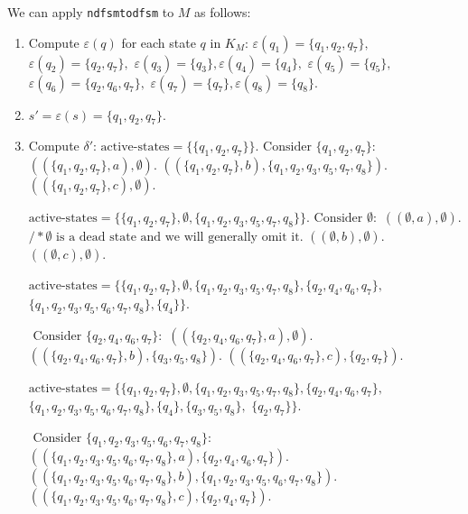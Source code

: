 \documentclass[hidelinks,12pt]{article}
\begin{document}
We can apply \texttt{ndfsmtodfsm} to \( M \) as follows:
\begin{enumerate}
    \item Compute \( \varepsilon(q) \) for each state $ q$ in $ K_M $:
        $ \varepsilon(q_1) = \{q_1, q_2, q_7\}, $
        $ \varepsilon(q_2) = \{q_2, q_7\}, $
        $ \varepsilon(q_3) = \{q_3\}, \varepsilon(q_4) = \{q_4\}, $
        $ \varepsilon(q_5) = \{q_5\}, $
        $ \varepsilon(q_6) = \{q_2, q_6, q_7\}, $
        $ \varepsilon(q_7) = \{q_7\}, \varepsilon(q_8) = \{q_8\}. $

    \item \( s' = \varepsilon(s) = \{q_1, q_2, q_7\} \).

    \item Compute \( \delta' \):
        $ \text{active-states} = \{\{q_1, q_2, q_7\}\}. 

        \text{ Consider } \{q_1, q_2, q_7\}: $
        $ ((\{q_1, q_2, q_7\}, a), \emptyset). $
        $ ((\{q_1, q_2, q_7\}, b), \{q_1, q_2, q_3, q_5, q_7, q_8\}). $
        $ ((\{q_1, q_2, q_7\}, c), \emptyset). $

        $ \text{active-states} = \{\{q_1, q_2, q_7\}, \emptyset, \{q_1, q_2, q_3, q_5, q_7, q_8\}\}. 

        \text{ Consider } \emptyset: $
        $ ((\emptyset, a), \emptyset). $
        $ /* \emptyset \text{ is a dead state and we will generally omit it.} $
        $ ((\emptyset, b), \emptyset). $
        $ ((\emptyset, c), \emptyset). $

        $ \text{active-states} = \{\{q_1, q_2, q_7\}, \emptyset, \{q_1, q_2, q_3, q_5, q_7, q_8\}, \{q_2, q_4, q_6, q_7\}, $
        $ \{q_1, q_2, q_3, q_5, q_6, q_7, q_8\}, \{q_4\}\}.$ 

        $\text{ Consider } \{q_2, q_4, q_6, q_7\}: $
        $ ((\{q_2, q_4, q_6, q_7\}, a), \emptyset). $
        $ ((\{q_2, q_4, q_6, q_7\}, b), \{q_3, q_5, q_8\}). $
        $ ((\{q_2, q_4, q_6, q_7\}, c), \{q_2, q_7\}). $

        $ \text{active-states} = \{\{q_1, q_2, q_7\}, \emptyset, \{q_1, q_2, q_3, q_5, q_7, q_8\}, \{q_2, q_4, q_6, q_7\}, $
        $ \{q_1, q_2, q_3, q_5, q_6, q_7, q_8\}, \{q_4\}, \{q_3, q_5, q_8\}, $
        $ \{q_2, q_7\}\}.$

        $ \text{ Consider } \{q_1, q_2, q_3, q_5, q_6, q_7, q_8\}: $
        $ ((\{q_1, q_2, q_3, q_5, q_6, q_7, q_8\}, a), \{q_2, q_4, q_6, q_7\}). $
        $ ((\{q_1, q_2, q_3, q_5, q_6, q_7, q_8\}, b), \{q_1, q_2, q_3, q_5, q_6, q_7, q_8\}). $
        $ ((\{q_1, q_2, q_3, q_5, q_6, q_7, q_8\}, c), \{q_2, q_4, q_7\}). $


\end{enumerate}
\end{document}
